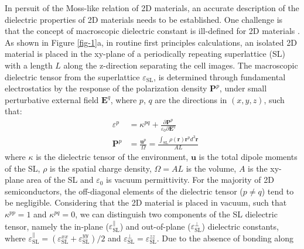 \documentclass[journal=ancac3,manuscript=article,email=true,hyperref=true,keywords=false]{achemso}
\begin{document}
In persuit of the Moss-like relation of 2D materials, an accurate
description of the dielectric properties of 2D materials needs to be
established. One challenge is that the concept of macroscopic
dielectric constant is ill-defined for 2D materials
\cite{Cudazzo_2010_screen2D,Cudazzo_2011_screening_2D,Nazarov_2015_2D_3D}. As
shown in Figure \ref{fig-1}a, in routine first principles
calculations, an isolated 2D material is placed in the xy-plane of a
periodically repeating superlattice (SL) with a length $L$ along the
z-direction separating the cell images. The macroscopic dielectric
tensor from the superlattice $\varepsilon_{\mathrm{SL}}$, is
determined through fundamental electrostatics by the response of the
polarization density $\boldsymbol{P}^{p}$, under small
perturbative external field $\boldsymbol{E}^{q}$, where $p$, $q$ are
the directions in $(x, y, z)$, such that:
\begin{subequations}
  \begin{eqnarray}
      \label{eq:def-eps-1}
    &\varepsilon^{p} &= \kappa^{pq} +
                                 {\displaystyle \frac{\partial \boldsymbol{P}^{p}}
                                 {\varepsilon_{0} \partial \boldsymbol{E}^{q}}} \\
          \label{eq:def-eps-2}
    &\boldsymbol{P}^{p} &=  {\displaystyle \frac{\boldsymbol{u}^{p}}{\Omega}}
                          = {\displaystyle \frac{{\displaystyle
          \int_{\mathrm{SL}} \rho(\boldsymbol{r}) \boldsymbol{r}^{p} d^{3}\boldsymbol{r}}}
                          {AL}}
  \end{eqnarray}
\end{subequations}
where $\kappa$ is the dielectric tensor of the environment,
$\boldsymbol{u}$ is the total dipole moments of the SL, $\rho$ is the
spatial charge density, $\Omega=AL$ is the volume, $A$ is the xy-plane
area of the SL and $\varepsilon_{0}$ is vacuum permittivity. For the
majority of 2D semiconductors, the off-diagonal elements of the
dielectric tensor ($p \neq q$) tend to be negligible.  Considering
that the 2D material is placed in vacuum, such that $\kappa^{pp} = 1$
and $\kappa^{pq} = 0$, we can distinguish two components of the SL
dielectric tensor, namely the in-plane
($\varepsilon_{\mathrm{SL}}^{\parallel}$) and out-of-plane
($\varepsilon_{\mathrm{SL}}^{\perp}$) dielectric constants, where
$\varepsilon_{\mathrm{SL}}^{\parallel} =
(\varepsilon_{\mathrm{SL}}^{xx} + \varepsilon_{\mathrm{SL}}^{yy})/2$
and
$\varepsilon_{\mathrm{SL}}^{\perp} =
\varepsilon_{\mathrm{SL}}^{zz}$. Due to the absence of bonding along
\end{document}
